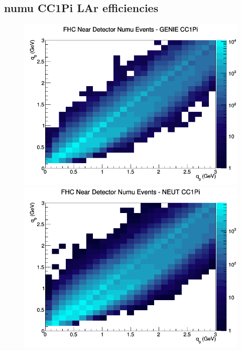 \documentclass[12pt]{article}
\begin{document}
\subsection{numu CC1Pi LAr efficiencies}
\begin{figure}[h]
\includegraphics[width=\linewidth]{eff_q0_q3/LAr/CC1Pi_FHC_ND_numu_q3_q0_GENIE.png}
\endminipage
{}
\includegraphics[width=\linewidth]{eff_q0_q3/LAr/CC1Pi_FHC_ND_numu_q3_q0_NEUT.png}
\endminipage
{}

\end{figure}
\end{document}
